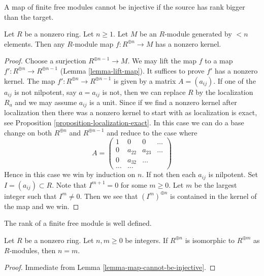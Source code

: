 \begin{lemma}
\label{lemma-map-cannot-be-injective}
\begin{slogan}
A map of finite free modules cannot be injective if the source has
rank bigger than the target.
\end{slogan}
Let $R$ be a nonzero ring. Let $n \geq 1$. Let $M$ be an $R$-module generated
by $< n$ elements. Then any $R$-module map $f : R^{\oplus n} \to M$ has a
nonzero kernel.
\end{lemma}

\begin{proof}
Choose a surjection $R^{\oplus n - 1} \to M$.
We may lift the map $f$ to a map $f' : R^{\oplus n} \to R^{\oplus n - 1}$
(Lemma \ref{lemma-lift-map}).
It suffices to prove $f'$ has a nonzero kernel.
The map $f' : R^{\oplus n} \to R^{\oplus n - 1}$ is given by a
matrix $A = (a_{ij})$. If one of the $a_{ij}$ is not nilpotent, say
$a = a_{ij}$ is not, then we can replace $R$ by the localization $R_a$
and we may assume $a_{ij}$ is a unit. Since if we find a nonzero kernel
after localization then there was a nonzero kernel to start with as
localization is exact, see Proposition \ref{proposition-localization-exact}.
In this case we can do a base change on both $R^{\oplus n}$
and $R^{\oplus n - 1}$ and reduce to the case where
$$
A =
\left(
\begin{matrix}
1 & 0 & 0 & \ldots \\
0 & a_{22} & a_{23} & \ldots \\
0 & a_{32} & \ldots \\
\ldots & \ldots
\end{matrix}
\right)
$$
Hence in this case we win by induction on $n$. If not then each
$a_{ij}$ is nilpotent. Set $I = (a_{ij}) \subset R$. Note that
$I^{m + 1} = 0$ for some $m \geq 0$. Let $m$ be the largest integer
such that $I^m \not = 0$. Then we see that $(I^m)^{\oplus n}$ is
contained in the kernel of the map and we win.
\end{proof}

\begin{lemma}
\label{lemma-rank}
\begin{slogan}
The rank of a finite free module is well defined.
\end{slogan}
Let $R$ be a nonzero ring. Let $n, m \geq 0$ be integers.
If $R^{\oplus n}$ is isomorphic to $R^{\oplus m}$ as
$R$-modules, then $n = m$.
\end{lemma}

\begin{proof}
Immediate from Lemma \ref{lemma-map-cannot-be-injective}.
\end{proof}





